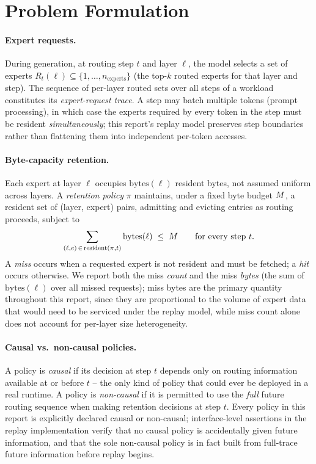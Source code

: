 \section{Problem Formulation}
\label{sec:problem-formulation}

\paragraph{Expert requests.} During generation, at routing step $t$ and
layer $\ell$, the model selects a set of experts
$R_t(\ell) \subseteq \{1,\dots,n_\text{experts}\}$ (the top-$k$ routed
experts for that layer and step). The sequence of per-layer routed sets
over all steps of a workload constitutes its \emph{expert-request
trace}. A step may batch multiple tokens (prompt processing), in which
case the experts required by every token in the step must be resident
\emph{simultaneously}; this report's replay model preserves step
boundaries rather than flattening them into independent per-token
accesses.

\paragraph{Byte-capacity retention.} Each expert at layer $\ell$ occupies
$\mathrm{bytes}(\ell)$ resident bytes, not assumed uniform across layers.
A \emph{retention policy} $\pi$ maintains, under a fixed byte budget
$M$, a resident set of (layer, expert) pairs, admitting and evicting
entries as routing proceeds, subject to
\begin{equation}
\sum_{(\ell,e)\,\in\,\text{resident}(\pi,t)} \mathrm{bytes}(\ell) \;\le\; M
\qquad \text{for every step } t. \label{eq:capacity}
\end{equation}
A \emph{miss} occurs when a requested expert is not resident and must be
fetched; a \emph{hit} occurs otherwise. We report both the miss
\emph{count} and the miss \emph{bytes} (the sum of $\mathrm{bytes}(\ell)$
over all missed requests); miss bytes are the primary quantity throughout
this report, since they are proportional to the volume of expert data
that would need to be serviced under the replay model, while miss count
alone does not account for per-layer size heterogeneity.

\paragraph{Causal vs.\ non-causal policies.} A policy is \emph{causal} if
its decision at step $t$ depends only on routing information available at
or before $t$ -- the only kind of policy that could ever be deployed in a
real runtime. A policy is \emph{non-causal} if it is permitted to use the
\emph{full} future routing sequence when making retention decisions at
step $t$. Every policy in this report is explicitly declared causal or
non-causal; interface-level assertions in the replay implementation
verify that no causal policy is accidentally given future information,
and that the sole non-causal policy is in fact built from full-trace
future information before replay begins.

